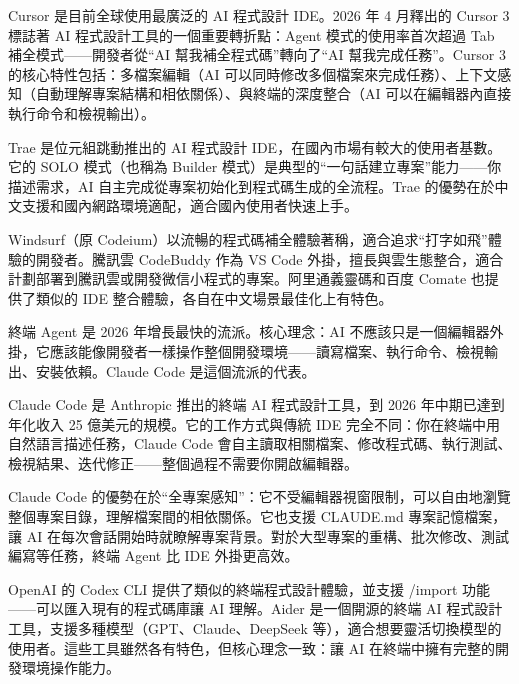 Cursor 是目前全球使用最廣泛的 AI 程式設計 IDE。2026 年 4 月釋出的 Cursor 3 標誌著 AI 程式設計工具的一個重要轉折點：Agent 模式的使用率首次超過 Tab 補全模式——開發者從“AI 幫我補全程式碼”轉向了“AI 幫我完成任務”。Cursor 3 的核心特性包括：多檔案編輯（AI 可以同時修改多個檔案來完成任務）、上下文感知（自動理解專案結構和相依關係）、與終端的深度整合（AI 可以在編輯器內直接執行命令和檢視輸出）。


Trae 是位元組跳動推出的 AI 程式設計 IDE，在國內市場有較大的使用者基數。它的 SOLO 模式（也稱為 Builder 模式）是典型的“一句話建立專案”能力——你描述需求，AI 自主完成從專案初始化到程式碼生成的全流程。Trae 的優勢在於中文支援和國內網路環境適配，適合國內使用者快速上手。


Windsurf（原 Codeium）以流暢的程式碼補全體驗著稱，適合追求“打字如飛”體驗的開發者。騰訊雲 CodeBuddy 作為 VS Code 外掛，擅長與雲生態整合，適合計劃部署到騰訊雲或開發微信小程式的專案。阿里通義靈碼和百度 Comate 也提供了類似的 IDE 整合體驗，各自在中文場景最佳化上有特色。


終端 Agent 是 2026 年增長最快的流派。核心理念：AI 不應該只是一個編輯器外掛，它應該能像開發者一樣操作整個開發環境——讀寫檔案、執行命令、檢視輸出、安裝依賴。Claude Code 是這個流派的代表。


Claude Code 是 Anthropic 推出的終端 AI 程式設計工具，到 2026 年中期已達到年化收入 25 億美元的規模。它的工作方式與傳統 IDE 完全不同：你在終端中用自然語言描述任務，Claude Code 會自主讀取相關檔案、修改程式碼、執行測試、檢視結果、迭代修正——整個過程不需要你開啟編輯器。

Claude Code 的優勢在於“全專案感知”：它不受編輯器視窗限制，可以自由地瀏覽整個專案目錄，理解檔案間的相依關係。它也支援 CLAUDE.md 專案記憶檔案，讓 AI 在每次會話開始時就瞭解專案背景。對於大型專案的重構、批次修改、測試編寫等任務，終端 Agent 比 IDE 外掛更高效。


OpenAI 的 Codex CLI 提供了類似的終端程式設計體驗，並支援 /import 功能——可以匯入現有的程式碼庫讓 AI 理解。Aider 是一個開源的終端 AI 程式設計工具，支援多種模型（GPT、Claude、DeepSeek 等），適合想要靈活切換模型的使用者。這些工具雖然各有特色，但核心理念一致：讓 AI 在終端中擁有完整的開發環境操作能力。


